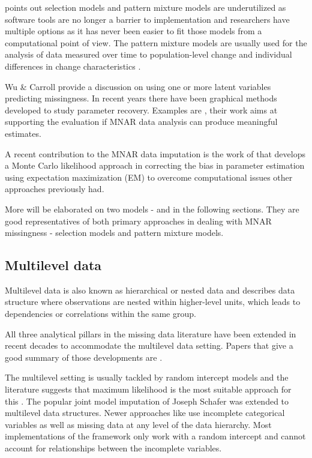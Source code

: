 \documentclass[11pt,a4paper]{article}
\begin{document}
\cite{enders_missing_2023} points out selection models and pattern mixture models are underutilized as software tools are no longer a barrier to implementation and researchers have multiple options as it has never been easier to fit those models from a computational point of view. The pattern mixture models are usually used for the analysis of data measured over time to population-level change and individual differences in change characteristics \cite{xu_sensitivity_2011}.  

Wu \& Carroll \cite{wu1988estimation} provide a discussion on using one or more latent variables predicting missingness.
In recent years there have been graphical methods developed to study parameter recovery. Examples are \cite{mohan2021graphical, mohan2013graphical}, their work aims at supporting the evaluation if MNAR data analysis can produce meaningful estimates. 

A recent contribution to the MNAR data imputation is the work of \cite{peng_handling_2023} that develops a Monte Carlo likelihood approach in correcting the bias in parameter estimation using expectation maximization (EM) to overcome computational issues other approaches previously had.


More will be elaborated on two models - \cite{galimard_heckman_2018} and \cite{Andridge_Little_2020} in the following sections. They are good representatives of both primary approaches in dealing with MNAR missingness - selection models and pattern mixture models. 


\subsection{Multilevel data}

Multilevel data is also known as hierarchical or nested data and describes data structure where observations are nested within higher-level units, which leads to dependencies or correlations within the same group. \cite{xu_sensitivity_2011} 

All three analytical pillars in the missing data literature have been extended in recent decades to accommodate the multilevel data setting. Papers that give a good summary of those developments are \cite{enders2022applied,grund2016multiple,grund2021treatment}.

The multilevel setting is usually tackled by random intercept models and the literature suggests that maximum likelihood is the most suitable approach for this \cite{enders_missing_2023}. The popular joint model imputation of Joseph Schafer \cite{olsen_two-part_2001} was extended to multilevel data structures. Newer approaches like \cite{asparouhov2010multiple} use incomplete categorical variables as well as missing data at any level of the data hierarchy.  Most implementations of the framework only work with a random intercept and cannot account for relationships between the incomplete variables. 
\end{document}
